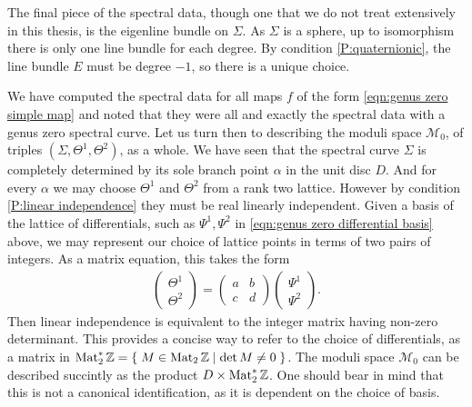 The final piece of the spectral data, though one that we do not treat extensively in this thesis, is the eigenline bundle on $Σ$. As $Σ$ is a sphere, up to isomorphism there is only one line bundle for each degree. By condition \ref{P:quaternionic}, the line bundle $E$ must be degree $-1$, so there is a unique choice.





We have computed the spectral data for all maps $f$ of the form \eqref{eqn:genus zero simple map} and noted that they were all and exactly the spectral data with a genus zero spectral curve. Let us turn then to describing the moduli space $\mathcal{M}_0$, of triples $(Σ,Θ^1,Θ^2)$, as a whole. We have seen that the spectral curve $Σ$ is completely determined by its sole branch point $α$ in the unit disc $D$. And for every $α$ we may choose $Θ^1$ and $Θ^2$ from a rank two lattice. However by condition \ref{P:linear independence} they must be real linearly independent. Given a basis of the lattice of differentials, such as $Ψ^1, Ψ^2$ in \eqref{eqn:genus zero differential basis} above, we may represent our choice of lattice points in terms of two pairs of integers. As a matrix equation, this takes the form
\begin{align*}
\begin{pmatrix}
Θ^1 \\ Θ^2
\end{pmatrix}
=
\begin{pmatrix}
a & b \\
c & d
\end{pmatrix}
\begin{pmatrix}
Ψ^1 \\ Ψ^2
\end{pmatrix}.
\end{align*}
Then linear independence is equivalent to the integer matrix having non-zero determinant. This provides a concise way to refer to the choice of differentials, as a matrix in $\Mat_2^*\Z = \Set{ M \in \Mat_2\Z }{\det M \neq 0}$. The moduli space $\mathcal{M}_0$ can be described succintly as the product $D \times \Mat_2^*\Z$. One should bear in mind that this is not a canonical identification, as it is dependent on the choice of basis.

